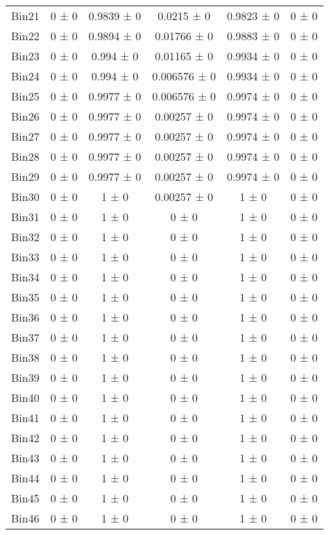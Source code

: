 \begin{tabular}{@{\extracolsep{4pt}}lccccc@{}}
     Bin21 & 0 ± 0 & 0.9839 ± 0 & 0.0215 ± 0 & 0.9823 ± 0 & 0 ± 0 \\ 
     Bin22 & 0 ± 0 & 0.9894 ± 0 & 0.01766 ± 0 & 0.9883 ± 0 & 0 ± 0 \\ 
     Bin23 & 0 ± 0 & 0.994 ± 0 & 0.01165 ± 0 & 0.9934 ± 0 & 0 ± 0 \\ 
     Bin24 & 0 ± 0 & 0.994 ± 0 & 0.006576 ± 0 & 0.9934 ± 0 & 0 ± 0 \\ 
     Bin25 & 0 ± 0 & 0.9977 ± 0 & 0.006576 ± 0 & 0.9974 ± 0 & 0 ± 0 \\ 
     Bin26 & 0 ± 0 & 0.9977 ± 0 & 0.00257 ± 0 & 0.9974 ± 0 & 0 ± 0 \\ 
     Bin27 & 0 ± 0 & 0.9977 ± 0 & 0.00257 ± 0 & 0.9974 ± 0 & 0 ± 0 \\ 
     Bin28 & 0 ± 0 & 0.9977 ± 0 & 0.00257 ± 0 & 0.9974 ± 0 & 0 ± 0 \\ 
     Bin29 & 0 ± 0 & 0.9977 ± 0 & 0.00257 ± 0 & 0.9974 ± 0 & 0 ± 0 \\ 
     Bin30 & 0 ± 0 & 1 ± 0 & 0.00257 ± 0 & 1 ± 0 & 0 ± 0 \\ 
     Bin31 & 0 ± 0 & 1 ± 0 & 0 ± 0 & 1 ± 0 & 0 ± 0 \\ 
     Bin32 & 0 ± 0 & 1 ± 0 & 0 ± 0 & 1 ± 0 & 0 ± 0 \\ 
     Bin33 & 0 ± 0 & 1 ± 0 & 0 ± 0 & 1 ± 0 & 0 ± 0 \\ 
     Bin34 & 0 ± 0 & 1 ± 0 & 0 ± 0 & 1 ± 0 & 0 ± 0 \\ 
     Bin35 & 0 ± 0 & 1 ± 0 & 0 ± 0 & 1 ± 0 & 0 ± 0 \\ 
     Bin36 & 0 ± 0 & 1 ± 0 & 0 ± 0 & 1 ± 0 & 0 ± 0 \\ 
     Bin37 & 0 ± 0 & 1 ± 0 & 0 ± 0 & 1 ± 0 & 0 ± 0 \\ 
     Bin38 & 0 ± 0 & 1 ± 0 & 0 ± 0 & 1 ± 0 & 0 ± 0 \\ 
     Bin39 & 0 ± 0 & 1 ± 0 & 0 ± 0 & 1 ± 0 & 0 ± 0 \\ 
     Bin40 & 0 ± 0 & 1 ± 0 & 0 ± 0 & 1 ± 0 & 0 ± 0 \\ 
     Bin41 & 0 ± 0 & 1 ± 0 & 0 ± 0 & 1 ± 0 & 0 ± 0 \\ 
     Bin42 & 0 ± 0 & 1 ± 0 & 0 ± 0 & 1 ± 0 & 0 ± 0 \\ 
     Bin43 & 0 ± 0 & 1 ± 0 & 0 ± 0 & 1 ± 0 & 0 ± 0 \\ 
     Bin44 & 0 ± 0 & 1 ± 0 & 0 ± 0 & 1 ± 0 & 0 ± 0 \\ 
     Bin45 & 0 ± 0 & 1 ± 0 & 0 ± 0 & 1 ± 0 & 0 ± 0 \\ 
     Bin46 & 0 ± 0 & 1 ± 0 & 0 ± 0 & 1 ± 0 & 0 ± 0 \\ 

\end{tabular}
